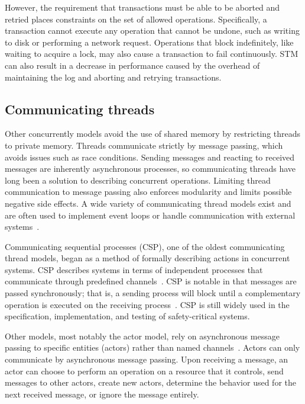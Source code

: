 \documentclass{sig-alternate}
\begin{document}
However, the requirement that transactions must be able to be aborted and retried places constraints on the set of allowed operations. Specifically, a transaction cannot execute any operation that cannot be undone, such as writing to disk or performing a network request. Operations that block indefinitely, like waiting to acquire a lock, may also cause a transaction to fail continuously. STM can also result in a decrease in performance caused by the overhead of maintaining the log and aborting and retrying transactions.

\subsection{Communicating threads}

Other concurrently models avoid the use of shared memory by restricting threads to private memory. Threads communicate strictly by message passing, which avoids issues such as race conditions. Sending messages and reacting to received messages are inherently asynchronous processes, so communicating threads have long been a solution to describing concurrent operations. Limiting thread communication to message passing also enforces modularity and limits possible negative side effects. A wide variety of communicating thread models exist and are often used to implement event loops or handle communication with external systems~\cite{Swalens2014}.

Communicating sequential processes (CSP), one of the oldest communicating thread models, began as a method of formally describing actions in concurrent systems. CSP describes systems in terms of independent processes that communicate through predefined channels~\cite{Hoare1978}. CSP is notable in that messages are passed synchronously; that is, a sending process will block until a complementary operation is executed on the receiving process~\cite{Swalens2014}. CSP is still widely used in the specification, implementation, and testing of safety-critical systems.

Other models, most notably the actor model, rely on asynchronous message passing to specific entities (actors) rather than named channels~\cite{Agha1986}. Actors can only communicate by asynchronous message passing. Upon receiving a message, an actor can choose to perform an operation on a resource that it controls, send messages to other actors, create new actors, determine the behavior used for the next received message, or ignore the message entirely.
\end{document}
